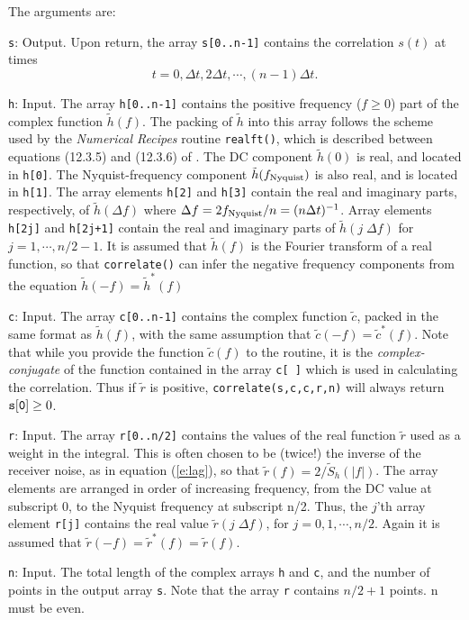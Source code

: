 The arguments are:
\begin{description}
\item{\tt s}: Output.  Upon return, the array {\tt s[0..n-1]} contains
  the correlation $s(t)$ at times 
  \begin{equation}
   \nonumber
    t=0,\Delta t, 2 \Delta t,\cdots,(n-1) \Delta t.
  \end{equation}
\item{\tt h}: Input.  The array {\tt h[0..n-1]} contains the positive
  frequency ($f \ge 0$) part of the complex function $\tilde h(f)$.
  The packing of $\tilde h$ into this array follows the scheme used by
  the {\it Numerical Recipes} routine {\tt realft()}, which is
  described between equations (12.3.5) and (12.3.6) of \cite{NumRec}.
  The DC component $\tilde h(0)$ is real, and located in {\tt h[0]}.
  The Nyquist-frequency component $\tilde h(f_{\rm Nyquist})$ is also
  real, and is located in {\tt h[1]}.  The array elements {\tt h[2]}
  and {\tt h[3]} contain the real and imaginary parts, respectively, of
  $\tilde h(\Delta f)$ where $\Delta f = 2 f_{\rm Nyquist}/n = (n
  \Delta t)^{-1}$.   Array elements {\tt h[2j]} and {\tt h[2j+1]}
  contain the real and imaginary parts of $\tilde h( j \; \Delta f)$
  for $j=1,\cdots,n/2-1$.  It is assumed that $\tilde h(f)$ is the
  Fourier transform of a real function, so that {\tt correlate()} can
  infer the negative frequency components from the equation $\tilde
  h(-f) = \tilde h^*(f)$
\item{\tt c}: Input.  The array {\tt c[0..n-1]} contains the complex
  function $\tilde c$, packed in the same format as $\tilde h(f)$,
  with the same assumption that $\tilde c(-f) = \tilde c^*(f)$.
  Note that while you provide the function $\tilde c(f)$ to the
  routine, it is the {\it complex-conjugate} of the function contained
  in the array {\tt c[ ]} which is used in calculating the correlation.
  Thus if $\tilde r$ is positive, {\tt correlate(s,c,c,r,n)} will
  always return ${\tt s[0]}\ge 0$.
\item{\tt r}: Input.  The array {\tt r[0..n/2]} contains the values of
  the real function $\tilde r$ used as a weight in the integral.  This
  is often chosen to be (twice!) the inverse of the receiver noise, as
  in equation (\ref{e:lag}), so that $\tilde r(f) = 2/\tilde
  S_h(|f|)$.  The array elements are arranged in order of increasing
  frequency, from the DC value at subscript 0, to the Nyquist frequency
  at subscript n/2.  Thus, the $j$'th array element {\tt r[j]} contains
  the real value $\tilde r(j \; \Delta f)$, for $j=0,1,\cdots,n/2$.
  Again it is assumed that $\tilde r(-f) = \tilde r^*(f) = \tilde r(f)$.
\item{\tt n}: Input.  The total length of the complex arrays
  {\tt h} and {\tt c}, and the number of points in the output
  array {\tt s}.  Note that the array {\tt r} contains $n/2+1$
  points.  n must be even.
\end{description}
